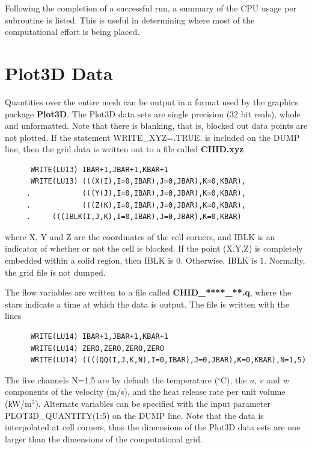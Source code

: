 \documentclass[11pt]{book}
\begin{document}
Following the completion of a successful run, a summary of the CPU
usage per subroutine is listed. This is useful in determining where
most of the computational effort is being placed.

\section{Plot3D Data}
\label{out:PL3D}

Quantities over the entire mesh can be output in a format used by the graphics package {\bf Plot3D}.
The Plot3D data sets are single precision (32 bit reals), whole and
unformatted. Note that there is blanking, that is,
blocked out data points are not plotted.
If the statement {\ct WRITE\_XYZ=.TRUE.} is included on the {\ct DUMP}
line, then the grid data is written out to a file called {\bf CHID.xyz}

\footnotesize
\begin{verbatim}
      WRITE(LU13) IBAR+1,JBAR+1,KBAR+1
      WRITE(LU13) (((X(I),I=0,IBAR),J=0,JBAR),K=0,KBAR),
     .            (((Y(J),I=0,IBAR),J=0,JBAR),K=0,KBAR),
     .            (((Z(K),I=0,IBAR),J=0,JBAR),K=0,KBAR),
     .     (((IBLK(I,J,K),I=0,IBAR),J=0,JBAR),K=0,KBAR)
\end{verbatim}
\normalsize
where {\ct X, Y} and {\ct Z} are the coordinates of the cell corners,
and {\ct IBLK} is an indicator of whether or not the cell is blocked.
If the point ({\ct X,Y,Z}) is completely embedded within a solid region,
then {\ct IBLK} is 0. Otherwise, {\ct IBLK} is 1. Normally, the grid
file is not dumped.

The flow variables are written to a file called {\bf CHID\_****\_**.q},
where the stars indicate a time at which the data is output.
The file is written with the lines

\footnotesize
\begin{verbatim}
      WRITE(LU14) IBAR+1,JBAR+1,KBAR+1
      WRITE(LU14) ZERO,ZERO,ZERO,ZERO
      WRITE(LU14) ((((QQ(I,J,K,N),I=0,IBAR),J=0,JBAR),K=0,KBAR),N=1,5)
\end{verbatim}
\normalsize
The five channels {\ct N=1,5} are by default the temperature
($^\circ$C), the $u$, $v$ and
$w$ components of the velocity (m/s), and the heat release rate
per unit volume (kW/m$^3$). Alternate variables can be specified with
the input parameter {\ct PLOT3D\_QUANTITY(1:5)} on the {\ct DUMP} line.
Note that the data is interpolated at
cell corners, thus the dimensions of the Plot3D data sets are
one larger than the dimensions of the computational grid.
\end{document}
